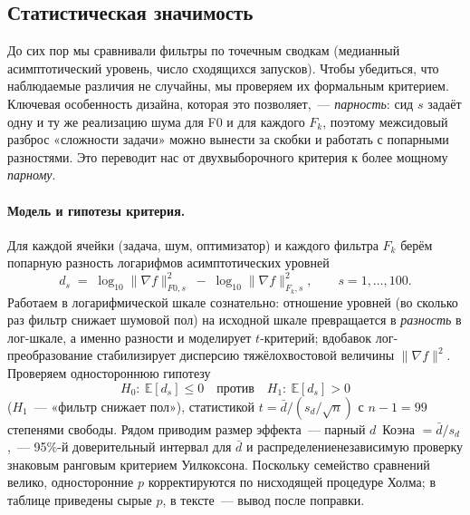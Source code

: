 \documentclass[conference]{IEEEtran}
\begin{document}
\subsection{Статистическая значимость}
\label{sec:stats}

До сих пор мы сравнивали фильтры по точечным сводкам (медианный
асимптотический уровень, число сходящихся запусков). Чтобы убедиться, что
наблюдаемые различия не случайны, мы проверяем их формальным критерием.
Ключевая особенность дизайна, которая это позволяет,~--- \emph{парность}:
сид $s$ задаёт одну и ту же реализацию шума для F0 и для каждого
$F_k$, поэтому межсидовый разброс «сложности задачи» можно вынести за
скобки и работать с попарными разностями. Это переводит нас от
двухвыборочного критерия к более мощному \emph{парному}.

\paragraph{Модель и гипотезы критерия.} Для каждой ячейки
(задача, шум, оптимизатор) и каждого фильтра $F_k$ берём попарную разность
логарифмов асимптотических уровней
\[
  d_s \;=\; \log_{10}\|\nabla f\|^2_{F0,s} \;-\; \log_{10}\|\nabla f\|^2_{F_k,s},
  \qquad s=1,\dots,100 .
\]
Работаем в логарифмической шкале сознательно: отношение уровней
(во сколько раз фильтр снижает шумовой пол) на исходной шкале
превращается в \emph{разность} в лог-шкале, а именно разности и моделирует
$t$-критерий; вдобавок лог-преобразование стабилизирует дисперсию
тяжёлохвостовой величины $\|\nabla f\|^2$. Проверяем одностороннюю
гипотезу
\[
  H_0:\ \mathbb{E}[d_s]\le 0
  \quad\text{против}\quad
  H_1:\ \mathbb{E}[d_s]>0
\]
($H_1$~--- «фильтр снижает пол»),
статистикой $t=\bar d/(s_d/\sqrt{n})$ с $n-1=99$ степенями свободы. Рядом
приводим размер эффекта~--- парный $d$~Коэна $=\bar d/s_d$,~--- 95\%-й
доверительный интервал для $\bar d$ и распределение\-независимую проверку
знаковым ранговым критерием Уилкоксона. Поскольку семейство сравнений
велико, односторонние $p$ корректируются по нисходящей процедуре
Холма; в таблице приведены сырые $p$, в тексте~--- вывод после поправки.
\end{document}
